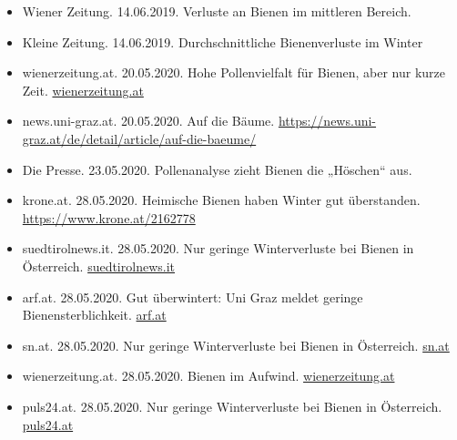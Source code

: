 \begin{itemize}
    \item
    Wiener Zeitung. 14.06.2019. Verluste an Bienen im mittleren Bereich.

    \item
    Kleine Zeitung. 14.06.2019. Durchschnittliche Bienenverluste im Winter
    
    \item
    wienerzeitung.at. 20.05.2020. Hohe Pollenvielfalt für Bienen, aber nur kurze Zeit. \href{https://www.wienerzeitung.at/nachrichten/wissen/natur/2061316-Hohe-Pollenvielfalt-fuer-Bienen-aber-nur-kurze-Zeit.html}{wienerzeitung.at}
    
    \item
    news.uni-graz.at. 20.05.2020. Auf die Bäume. 
    \url{https://news.uni-graz.at/de/detail/article/auf-die-baeume/}
    
    \item
    Die Presse. 23.05.2020. Pollenanalyse zieht Bienen die „Höschen“ aus.
    
    \item
    krone.at. 28.05.2020. Heimische Bienen haben Winter gut überstanden. 
    \url{https://www.krone.at/2162778}
    
    \item
    suedtirolnews.it. 28.05.2020. Nur geringe Winterverluste bei Bienen in Österreich. \href{https://www.suedtirolnews.it/wirtschaft/nur-geringe-winterverluste-bei-bienen-in-oesterreich}{suedtirolnews.it}
    
    \item
    arf.at. 28.05.2020. Gut überwintert: Uni Graz meldet geringe Bienensterblichkeit. \href{https://www.arf.at/2020/05/28/gut-ueberwintert-uni-graz-meldet-geringe-bienensterblichkeit/}{arf.at}
    
    \item
    sn.at. 28.05.2020. Nur geringe Winterverluste bei Bienen in Österreich. \href{https://www.sn.at/panorama/oesterreich/nur-geringe-winterverluste-bei-bienen-in-oesterreich-88150126}{sn.at}
    
    \item
    wienerzeitung.at. 28.05.2020. Bienen im Aufwind. \href{https://www.wienerzeitung.at/nachrichten/wissen/natur/2062201-Bienen-im-Aufwind.html}{wienerzeitung.at}
    
    \item
    puls24.at. 28.05.2020. Nur geringe Winterverluste bei Bienen in Österreich. \href{https://www.puls24.at/news/chronik/nur-geringe-winterverluste-bei-bienen-in-oesterreich/205520}{puls24.at}
    

\end{itemize}
